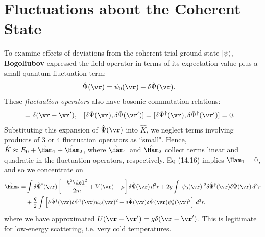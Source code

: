 \documentclass[a4paper, 11pt, normalem]{report}
\begin{document}
\section{Fluctuations about the Coherent State}
To examine effects of deviations from the coherent trial ground state $|\psi\rangle$, \textbf{Bogoliubov} expressed the field operator in terms of its expectation value plus a small quantum fluctuation term:
\begin{align}
    \hat{\Psi}(\vr) &= \psi_0(\vr) + \delta\hat{\Psi}(\vr).
\end{align}
These \emph{fluctuation operators} also have bosonic commutation relations:
\begin{align}
    [\delta\hat{\Psi}(\vr),\delta\hat{\Psi}^\dagger(\vr')] &= \delta(\vr-\vr'), & [\delta\hat{\Psi}(\vr),\delta\hat{\Psi}(\vr')] &= [\delta\hat{\Psi}^\dagger(\vr),\delta\hat{\Psi}^\dagger(\vr')] = 0.
\end{align}
Substituting this expansion of $\hat{\Psi}(\vr)$ into $\hat{K}$, we neglect terms involving products of 3 or 4 fluctuation operators as ``small".
Hence, $\hat{K}\approx E_0+\hat{\Ham}_1+\hat{\Ham}_2$, where $\hat{\Ham}_1$ and $\hat{\Ham}_2$ collect terms linear and quadratic in the fluctuation operators, respectively.
Eq (14.16) implies $\hat{\Ham}_1=0$, and so we concentrate on
\begin{align}
    \begin{split}
        \hat{\Ham}_2 = &\int \delta\hat{\Psi}^\dagger(\vr)\left[-\frac{\hbar^2\del^2}{2m}+V(\vr)-\mu\right]\delta\hat{\Psi}(\vr)\,d^3r + 2g\int |\psi_0(\vr)|^2\delta\hat{\Psi}^\dagger(\vr)\delta\hat{\Psi}(\vr)\,d^3r \\
                       &+\frac{g}{2}\int \left[\delta\hat{\Psi}^\dagger(\vr)\delta\hat{\Psi}^\dagger(\vr)\psi_0(\vr)^2 + \delta\hat{\Psi}(\vr)\delta\hat{\Psi}(\vr)\psi_0^*(\vr)^2\right]\,d^3r,
    \end{split}
\end{align}
where we have approximated $U(\vr-\vr')=g\delta(\vr-\vr')$.
This is legitimate for low-energy scattering, i.e. very cold temperatures.
\end{document}
